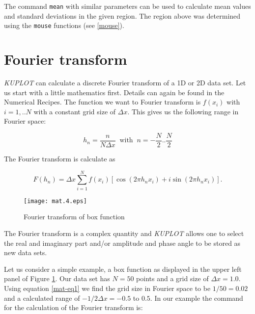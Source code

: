 The command {\tt mean} with similar parameters can be used to
calculate mean values and standard deviations in the given region.
The region above was determined using the {\tt mouse} functions (see
\ref{mouse}).


\section{Fourier transform \label{mat-four}}

{\it KUPLOT} can calculate a discrete Fourier transform of a 1D or
2D data set. Let us start with a little mathematics first. Details
can again be found in the Numerical Recipes. The function we want
to Fourier transform is $f(x_{i})$ with $i=1,..N$ with a constant
grid size of $\Delta x$. This gives us the following range in Fourier
space:

\begin{equation}
  h_{n} = \frac{n}{N \Delta x} \;\; \mbox{with} \;\;
      n = -\frac{N}{2} .. \frac{N}{2}
  \label{mat-eq1}
\end{equation}

\noindent
The Fourier transform is calculate as

\begin{equation}
  F(h_{n}) = \Delta x \sum_{i=1}^{N} f(x_{i}) \left [
             \cos (2\pi h_{n}x_{i}) + i \sin (2\pi h_{n}x_{i}) \right ].
  \label{mat-eq2}
\end{equation}

\begin{figure}[!t]
   \centering
   \texttt{[image: mat.4.eps]}
   \caption{Fourier transform of box function}
   \label{mat-fig4}
\end{figure}

The Fourier transform is a complex quantity and {\it KUPLOT} allows one
to select the real and imaginary part and/or amplitude and phase angle
to be stored as new data sets. \par

Let us consider a simple example, a box function as displayed in the
upper left panel of Figure \ref{mat-fig4}. Our data set has $N=50$
points and a grid size of $\Delta x = 1.0$. Using equation \ref{mat-eq1}
we find the grid size in Fourier space to be $1/50 = 0.02$ and a
calculated range of $-1/2\Delta x = -0.5$ to $0.5$. In our example
the command for the calculation of the Fourier transform is:

